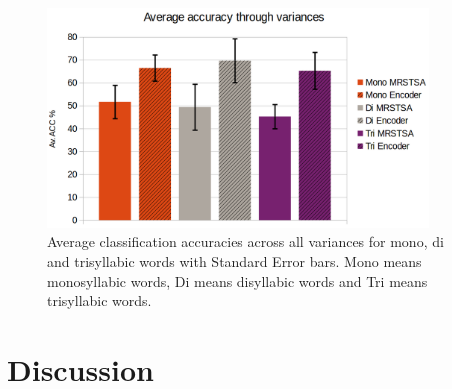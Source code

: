 \documentclass[10pt,letterpaper]{article}
\begin{document}
\begin{figure}[h!]
    \centering
    \includegraphics[width=0.9\textwidth]{AV_ACC.png}
    \caption{Average classification accuracies across all variances for mono, di and trisyllabic words with Standard Error bars.
    Mono means monosyllabic words, Di means disyllabic words and Tri means trisyllabic words.}
    \label{fig:AV_ACC}
\end{figure}









\section*{Discussion}

\end{document}
